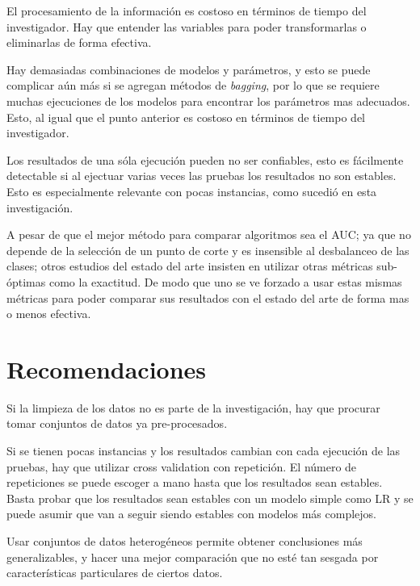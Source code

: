 El procesamiento de la información es costoso en términos de tiempo del investigador. Hay que entender las variables para poder transformarlas o eliminarlas de forma efectiva.

Hay demasiadas combinaciones de modelos y parámetros, y esto se puede complicar aún más si se agregan métodos de \textit{bagging}, por lo que se requiere muchas ejecuciones de los modelos para encontrar los parámetros mas adecuados. Esto, al igual que el punto anterior es costoso en términos de tiempo del investigador.

Los resultados de una sóla ejecución pueden no ser confiables, esto es fácilmente detectable si al ejectuar varias veces las pruebas los resultados no son estables. Esto es especialmente relevante con pocas instancias, como sucedió en esta investigación.

A pesar de que el mejor método para comparar algoritmos sea el AUC; ya que no depende de la selección de un punto de corte y es insensible al desbalanceo de las clases; otros estudios del estado del arte insisten en utilizar otras métricas sub-óptimas como la exactitud. De modo que uno se ve forzado a usar estas mismas métricas para poder comparar sus resultados con el estado del arte de forma mas o menos efectiva.


\section{Recomendaciones}

Si la limpieza de los datos no es parte de la investigación, hay que procurar tomar conjuntos de datos ya pre-procesados.

Si se tienen pocas instancias y los resultados cambian con cada ejecución de las pruebas, hay que utilizar cross validation con repetición. El número de repeticiones se puede escoger a mano hasta que los resultados sean estables. Basta probar que los resultados sean estables con un modelo simple como \ac{LR} y se puede asumir que van a seguir siendo estables con modelos más complejos.

Usar conjuntos de datos heterogéneos permite obtener conclusiones más generalizables, y hacer una mejor comparación que no esté tan sesgada por características particulares de ciertos datos.

